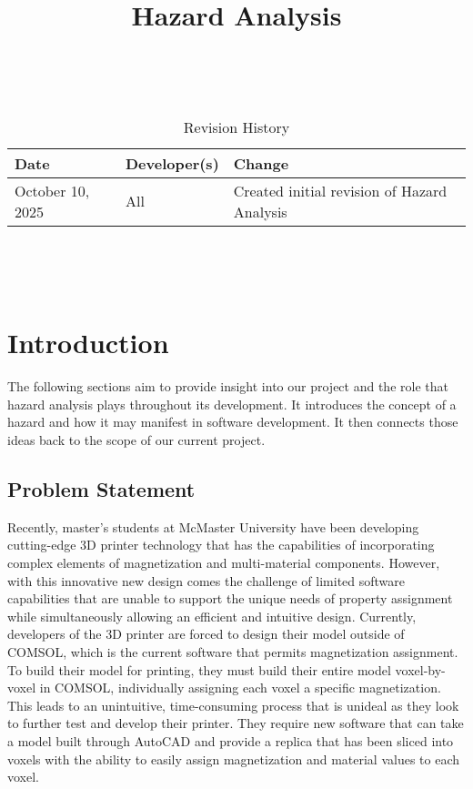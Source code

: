 \documentclass{article}
\title{Hazard Analysis\\\progname}
\author{\authname}
\date{}
\begin{document}
\maketitle
\thispagestyle{empty}

~\newpage


\begin{table}[hp]
\caption{Revision History} \label{TblRevisionHistory}
\begin{tabularx}{\textwidth}{llX}
\toprule
\textbf{Date} & \textbf{Developer(s)} & \textbf{Change}\\
\midrule
October 10, 2025 & All & Created initial revision of Hazard Analysis\\
\bottomrule
\end{tabularx}
\end{table}

~\newpage

\tableofcontents

~\newpage



\section{Introduction}

The following sections aim to provide insight into our project and the role that hazard analysis
plays throughout its development. It introduces the concept of a hazard and how it may manifest
in software development. It then connects those ideas back to the scope of our current project.

\subsection{Problem Statement}

Recently, master's students at McMaster University have been developing cutting-edge 3D
printer technology that has the capabilities of incorporating complex elements of
magnetization and multi-material components. However, with this innovative new design
comes the challenge of limited software capabilities that are unable to support the
unique needs of property assignment while simultaneously allowing an efficient and
intuitive design. Currently, developers of the 3D printer are forced to design their
model outside of COMSOL, which is the current software that permits magnetization assignment.
To build their model for printing, they must build their entire model voxel-by-voxel in
COMSOL, individually assigning each voxel a specific magnetization. This leads to an
unintuitive, time-consuming process that is unideal as they look to further test and develop
their printer. They require new software that can take a model built through AutoCAD and
provide a replica that has been sliced into voxels with the ability to easily assign
magnetization and material values to each voxel.
\end{document}
